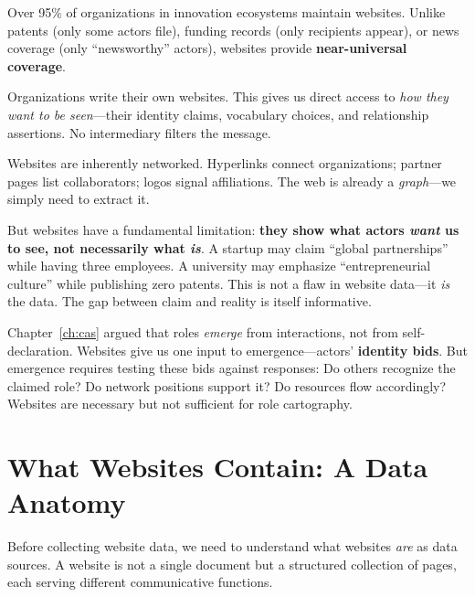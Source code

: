 \documentclass[../main.tex]{subfiles}
\begin{document}
\begin{description}[leftmargin=0.5cm, itemsep=0.4em]
\item[Ubiquity.] Over 95\% of organizations in innovation ecosystems maintain websites. Unlike patents (only some actors file), funding records (only recipients appear), or news coverage (only ``newsworthy'' actors), websites provide \textbf{near-universal coverage}.

\item[Self-authorship.] Organizations write their own websites. This gives us direct access to \emph{how they want to be seen}---their identity claims, vocabulary choices, and relationship assertions. No intermediary filters the message.

\item[Relationality.] Websites are inherently networked. Hyperlinks connect organizations; partner pages list collaborators; logos signal affiliations. The web is already a \emph{graph}---we simply need to extract it.
\end{description}

But websites have a fundamental limitation: \textbf{they show what actors \emph{want} us to see, not necessarily what \emph{is}}. A startup may claim ``global partnerships'' while having three employees. A university may emphasize ``entrepreneurial culture'' while publishing zero patents. This is not a flaw in website data---it \emph{is} the data. The gap between claim and reality is itself informative.

\begin{insightbox}
Chapter~\ref{ch:cas} argued that roles \emph{emerge} from interactions, not from self-declaration. Websites give us one input to emergence---actors' \textbf{identity bids}. But emergence requires testing these bids against responses: Do others recognize the claimed role? Do network positions support it? Do resources flow accordingly? Websites are necessary but not sufficient for role cartography.
\end{insightbox}


\section*{What Websites Contain: A Data Anatomy}

Before collecting website data, we need to understand what websites \emph{are} as data sources. A website is not a single document but a structured collection of pages, each serving different communicative functions.
\end{document}
